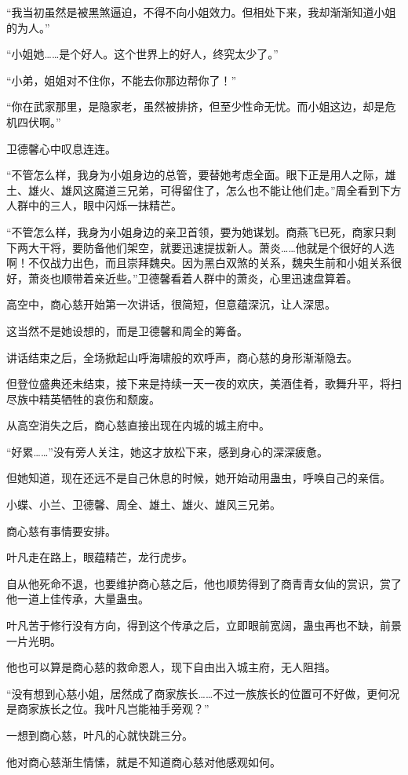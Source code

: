 \begin{this_body}
“我当初虽然是被黑煞逼迫，不得不向小姐效力。但相处下来，我却渐渐知道小姐的为人。”

“小姐她……是个好人。这个世界上的好人，终究太少了。”

“小弟，姐姐对不住你，不能去你那边帮你了！”

“你在武家那里，是隐家老，虽然被排挤，但至少性命无忧。而小姐这边，却是危机四伏啊。”

卫德馨心中叹息连连。

“不管怎么样，我身为小姐身边的总管，要替她考虑全面。眼下正是用人之际，雄土、雄火、雄风这魔道三兄弟，可得留住了，怎么也不能让他们走。”周全看到下方人群中的三人，眼中闪烁一抹精芒。

“不管怎么样，我身为小姐身边的亲卫首领，要为她谋划。商燕飞已死，商家只剩下两大干将，要防备他们架空，就要迅速提拔新人。萧炎……他就是个很好的人选啊！不仅战力出色，而且崇拜魏央。因为黑白双煞的关系，魏央生前和小姐关系很好，萧炎也顺带着亲近些。”卫德馨看着人群中的萧炎，心里迅速盘算着。

高空中，商心慈开始第一次讲话，很简短，但意蕴深沉，让人深思。

这当然不是她设想的，而是卫德馨和周全的筹备。

讲话结束之后，全场掀起山呼海啸般的欢呼声，商心慈的身形渐渐隐去。

但登位盛典还未结束，接下来是持续一天一夜的欢庆，美酒佳肴，歌舞升平，将扫尽族中精英牺牲的哀伤和颓废。

从高空消失之后，商心慈直接出现在内城的城主府中。

“好累……”没有旁人关注，她这才放松下来，感到身心的深深疲惫。

但她知道，现在还远不是自己休息的时候，她开始动用蛊虫，呼唤自己的亲信。

小蝶、小兰、卫德馨、周全、雄土、雄火、雄风三兄弟。

商心慈有事情要安排。

叶凡走在路上，眼蕴精芒，龙行虎步。

自从他死命不退，也要维护商心慈之后，他也顺势得到了商青青女仙的赏识，赏了他一道上佳传承，大量蛊虫。

叶凡苦于修行没有方向，得到这个传承之后，立即眼前宽阔，蛊虫再也不缺，前景一片光明。

他也可以算是商心慈的救命恩人，现下自由出入城主府，无人阻挡。

“没有想到心慈小姐，居然成了商家族长……不过一族族长的位置可不好做，更何况是商家族长之位。我叶凡岂能袖手旁观？”

一想到商心慈，叶凡的心就快跳三分。

他对商心慈渐生情愫，就是不知道商心慈对他感观如何。


\end{this_body}
